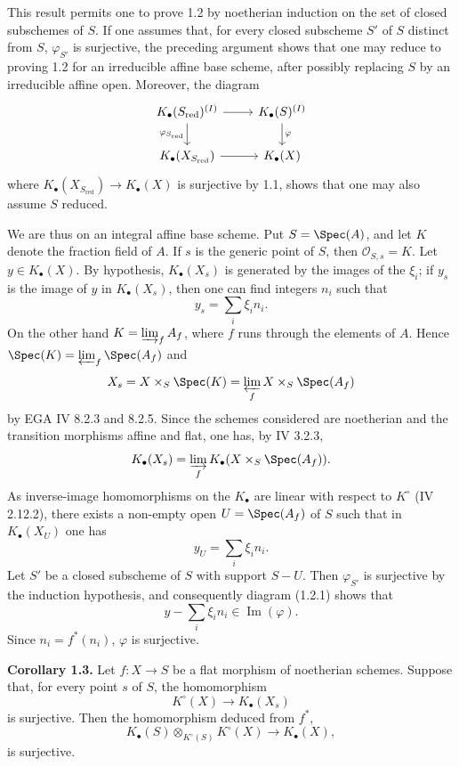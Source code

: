 This result permits one to prove 1.2 by noetherian induction on the set of closed subschemes of $S$. If one assumes that, for every closed subscheme $S'$ of $S$ distinct from $S$, $\varphi_{S'}$ is surjective, the preceding argument shows that one may reduce to proving 1.2 for an irreducible affine base scheme, after possibly replacing $S$ by an irreducible affine open. Moreover, the diagram
\[
\begin{tikzcd}
K_\bullet(S_{\mathrm{red}})^{(I)} \arrow[r] \arrow[d,"\varphi_{S_{\mathrm{red}}}"'] & K_\bullet(S)^{(I)} \arrow[d,"\varphi"]\\
K_\bullet(X_{S_{\mathrm{red}}}) \arrow[r] & K_\bullet(X)
\end{tikzcd}
\]
where $K_\bullet(X_{S_{\mathrm{red}}})\to K_\bullet(X)$ is surjective by 1.1, shows that one may also assume $S$ reduced.

We are thus on an integral affine base scheme. Put $S=\Spec(A)$, and let $K$ denote the fraction field of $A$. If $s$ is the generic point of $S$, then $\mathcal O_{S,s}=K$. Let $y\in K_\bullet(X)$. By hypothesis, $K_\bullet(X_s)$ is generated by the images of the $\xi_i$; if $y_s$ is the image of $y$ in $K_\bullet(X_s)$, then one can find integers $n_i$ such that
\[
 y_s=\sum_i \xi_i n_i.
\]
On the other hand $K=\varinjlim_f A_f$, where $f$ runs through the elements of $A$. Hence $\Spec(K)=\varprojlim_f \Spec(A_f)$ and
\[
 X_s=X\times_S\Spec(K)=\varprojlim_f X\times_S\Spec(A_f)
\]
by EGA IV 8.2.3 and 8.2.5. Since the schemes considered are noetherian and the transition morphisms affine and flat, one has, by IV 3.2.3,
\[
 K_\bullet(X_s)=\varinjlim_f K_\bullet(X\times_S\Spec(A_f)).
\]
As inverse-image homomorphisms on the $K_\bullet$ are linear with respect to $K^\circ$ (IV 2.12.2), there exists a non-empty open $U=\Spec(A_f)$ of $S$ such that in $K_\bullet(X_U)$ one has
\[
 y_U=\sum_i \xi_i n_i.
\]
Let $S'$ be a closed subscheme of $S$ with support $S-U$. Then $\varphi_{S'}$ is surjective by the induction hypothesis, and consequently diagram (1.2.1) shows that
\[
 y-
\sum_i\xi_i n_i\in \operatorname{Im}(\varphi).
\]
Since $n_i=f^*(n_i)$, $\varphi$ is surjective.

\textbf{Corollary 1.3.} Let $f:X\to S$ be a flat morphism of noetherian schemes. Suppose that, for every point $s$ of $S$, the homomorphism
\[
 K^\circ(X)\longrightarrow K_\bullet(X_s)
\]
is surjective. Then the homomorphism deduced from $f^*$,
\[
 K_\bullet(S)\otimes_{K^\circ(S)}K^\circ(X)\longrightarrow K_\bullet(X),
\]
is surjective.


